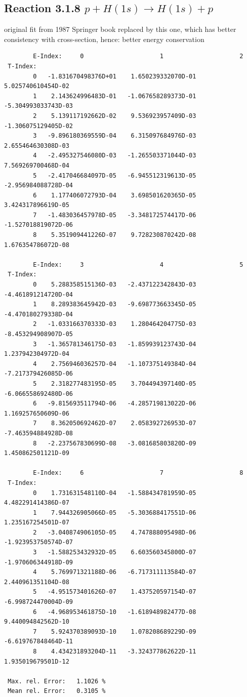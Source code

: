 \documentclass[12pt,dvipdfmx]{article}
\begin{document}
\newpage
\subsection{
Reaction 3.1.8 $   p + H(1s) \rightarrow H(1s) + p$}

original fit from 1987 Springer book replaced by this one, which has better
consistency with cross-section, hence: better energy conservation

\begin{small}\begin{verbatim}
        E-Index:     0                     1                     2
 T-Index:
        0   -1.831670498376D+01    1.650239332070D-01    5.025740610454D-02
        1    2.143624996483D-01   -1.067658289373D-01   -5.304993033743D-03
        2    5.139117192662D-02    9.536923957409D-03   -1.306075129405D-02
        3   -9.896180369559D-04    6.315097684976D-03    2.655464630308D-03
        4   -2.495327546080D-03   -1.265503371044D-03    7.569269700468D-04
        5   -2.417046684097D-05   -6.945512319613D-05   -2.956984088728D-04
        6    1.177406072793D-04    3.698501620365D-05    3.424317896619D-05
        7   -1.483036457978D-05   -3.348172574417D-06   -1.527018819072D-06
        8    5.351909441226D-07    9.728230870242D-08    1.676354786072D-08

        E-Index:     3                     4                     5
 T-Index:
        0    5.288358515136D-03   -2.437122342843D-03   -4.461891214720D-04
        1    8.289383645942D-03   -9.698773663345D-05   -4.470180279338D-04
        2   -1.033166370333D-03    1.280464204775D-03   -8.453294908907D-05
        3   -1.365781346175D-03   -1.859939123743D-04    1.237942304972D-04
        4    2.756946036257D-04   -1.107375149384D-04   -7.217379426085D-06
        5    2.318277483195D-05    3.704494397140D-05   -6.066558692480D-06
        6   -9.815693511794D-06   -4.285719813022D-06    1.169257650609D-06
        7    8.362050692462D-07    2.058392726953D-07   -7.463594884928D-08
        8   -2.237567830699D-08   -3.081685803820D-09    1.450862501121D-09

        E-Index:     6                     7                     8
 T-Index:
        0    1.731631548110D-04   -1.588434781959D-05    4.482291414386D-07
        1    7.944326905066D-05   -5.303688417551D-06    1.235167254501D-07
        2   -3.040874906105D-05    4.747888095498D-06   -1.923953750574D-07
        3   -1.588253432932D-05    6.603560345800D-07   -1.970606344918D-09
        4    5.769971321188D-06   -6.717311113584D-07    2.440961351104D-08
        5   -4.951573401626D-07    1.437520597154D-07   -6.998724470004D-09
        6   -4.968953461875D-10   -1.618948982477D-08    9.440094842562D-10
        7    5.924370389093D-10    1.078208689229D-09   -6.619767848464D-11
        8    4.434231893204D-11   -3.324377862622D-11    1.935019679501D-12

 Max. rel. Error:   1.1026 %
 Mean rel. Error:   0.3105 %

\end{verbatim}\end{small}
\end{document}
